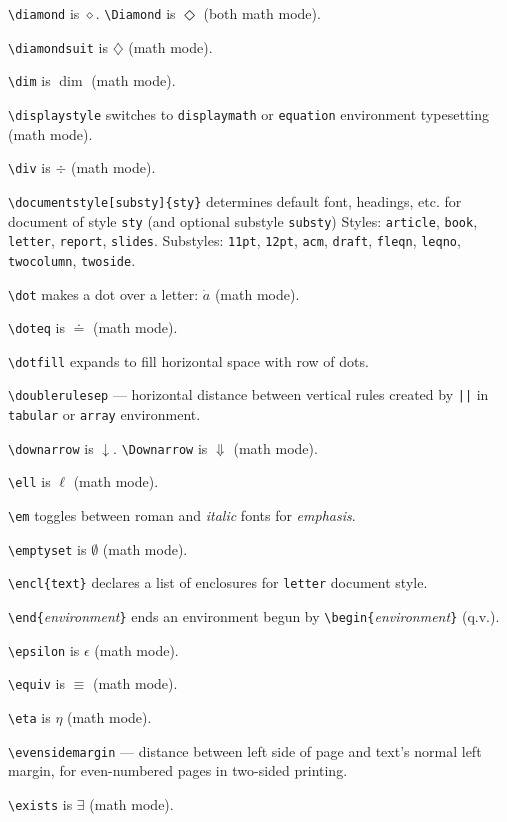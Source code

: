 \verb"\diamond" is $\diamond$. \verb"\Diamond" is $\Diamond$ (both math mode).

\verb"\diamondsuit" is $\diamondsuit$ (math mode).

\verb"\dim" is $\dim$ (math mode).

\verb"\displaystyle" switches to \verb"displaymath" or \verb"equation"
	environment typesetting (math mode).

\verb"\div" is $\div$ (math mode).

\verb"\documentstyle[substy]{sty}" determines default font, headings, etc. for
	document of style \verb"sty" (and optional substyle \verb"substy")
	Styles: \verb"article", \verb"book", \verb"letter", \verb"report",
	\verb"slides".  Substyles: \verb"11pt", \verb"12pt", \verb"acm",
	\verb"draft", \verb"fleqn", \verb"leqno",
	\verb"twocolumn", \verb"twoside".

\verb"\dot" makes a dot over a letter: $\dot a$ (math mode).

\verb"\doteq" is $\doteq$ (math mode).

\verb"\dotfill" expands to fill horizontal space with row of dots.

\verb"\doublerulesep" --- horizontal distance between vertical rules created
	by \verb"||" in \verb"tabular" or \verb"array" environment.

\verb"\downarrow" is $\downarrow$. \verb"\Downarrow" is $\Downarrow$
	(math mode).

\verb"\ell" is $\ell$ (math mode).

\verb"\em" toggles between roman and {\em italic} fonts for {\em emphasis}.

\verb"\emptyset" is $\emptyset$ (math mode).

\verb"\encl{text}" declares a list of enclosures for \verb"letter"
	document style.

\verb"\end{"{\it environment\/}\verb"}" ends an environment begun by
	\verb"\begin{"{\it environment\/}\verb"}" (q.v.).

\verb"\epsilon" is $\epsilon$ (math mode).

\verb"\equiv" is $\equiv$ (math mode).

\verb"\eta" is $\eta$ (math mode).

\verb"\evensidemargin" --- distance between left side of page and text's
	normal left margin, for even-numbered pages in two-sided printing.

\verb"\exists" is $\exists$ (math mode).

